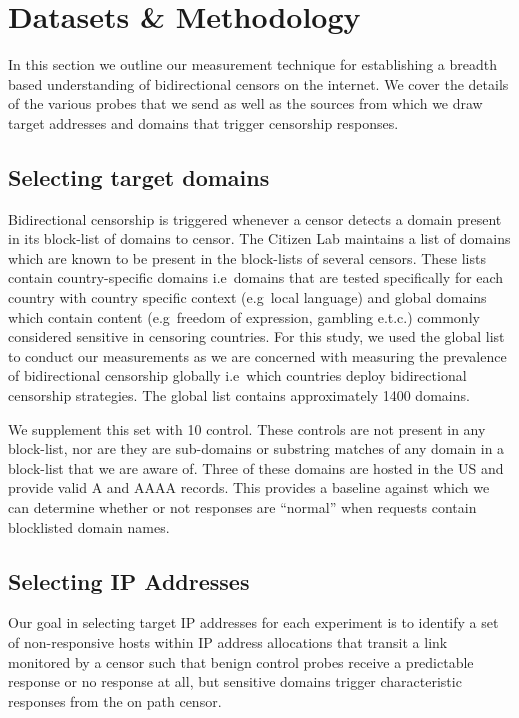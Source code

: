 \section{Datasets \& Methodology}\label{sec:methodology}

In this section we outline our measurement technique for establishing a breadth
based understanding of bidirectional censors on the internet. We cover the
details of the various probes that we send as well as the sources from which we
draw target addresses and domains that trigger censorship responses.

\FigProbeSend

\subsection{Selecting target domains}
\label{sec:methodology:domains}
Bidirectional censorship is triggered whenever a censor detects a domain present
in its block-list of domains to censor. The Citizen Lab \cite{TheCitiz6:online}
maintains a list of domains \cite{testlist} which are known to be present in the
block-lists of several censors. These lists contain country-specific domains
i.e\ domains that are tested specifically for each country with country specific
context (e.g\ local language) and global domains which contain content (e.g\
freedom of expression, gambling e.t.c.) commonly considered sensitive in
censoring countries. For this study, we used the global list to conduct our
measurements as we are concerned with measuring the prevalence of bidirectional
censorship globally i.e\ which countries deploy bidirectional censorship
strategies. The global list contains approximately 1400 domains.

We supplement this set with 10 control. These controls are not present
in any block-list, nor are they are sub-domains or substring matches of any
domain in a block-list that we are aware of. Three of these domains are
hosted in the US and provide valid A and AAAA records. This provides a baseline
against which we can determine whether or not responses are ``normal'' when
requests contain blocklisted domain names.

\subsection{Selecting IP Addresses}
\label{subsec:selecting-ips}
Our goal in selecting target IP addresses for each experiment is to identify a
set of non-responsive hosts within IP address allocations that transit a link
monitored by a censor such that benign control probes receive a predictable
response or no response at all, but sensitive domains trigger characteristic
responses from the on path censor.

